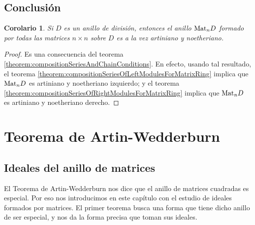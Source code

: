 \documentclass{report}
\newcommand{\Mat}{\textnormal{Mat}}
\newtheorem{corollary}{Corolario}
\begin{document}
  \section{Conclusión}

  \begin{corollary}
    \label{corollary:matrixRingIsArtinianAndNoetherian}
    Si \(D\) es un anillo de división, entonces el anillo \(\Mat_n D\) formado por todas las matrices \(n \times n\) sobre \(D\) es a la vez artiniano y noetheriano.
  \end{corollary}
  \begin{proof}
    Es una consecuencia del teorema \ref{theorem:compositionSeriesAndChainConditions}.
    En efecto, usando tal resultado, el teorema \ref{theorem:compositionSeriesOfLeftModulesForMatrixRing} implica que \(\Mat_n D\) es artiniano y noetheriano izquierdo; y el teorema \ref{theorem:compositionSeriesOfRightModulesForMatrixRing} implica que \(\Mat_n D\) es artiniano y noetheriano derecho.
  \end{proof}

  \chapter{Teorema de Artin-Wedderburn}

  \section{Ideales del anillo de matrices}

  El Teorema de Artin-Wedderburn nos dice que el anillo de matrices cuadradas es especial.
  Por eso nos introducimos en este capítulo con el estudio de ideales formados por matrices.
  El primer teorema busca una forma que tiene dicho anillo de ser especial, y nos da la forma precisa que toman sus ideales.
\end{document}
